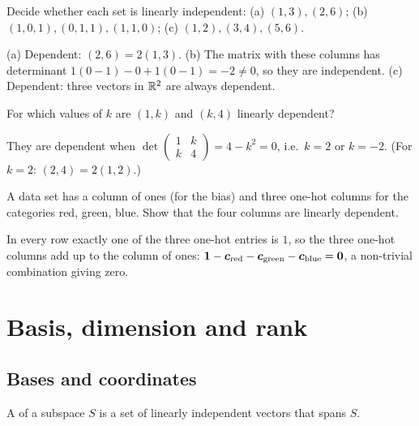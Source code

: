 \sectionexercises

\begin{exercise}
Decide whether each set is linearly independent: (a) $(1, 3), (2, 6)$;
(b) $(1, 0, 1), (0, 1, 1), (1, 1, 0)$; (c) $(1, 2), (3, 4), (5, 6)$.
\end{exercise}
\begin{solution}
(a) Dependent: $(2,6) = 2(1,3)$. (b) The matrix with these columns has
determinant $1(0 - 1) - 0 + 1(0 - 1) = -2 \neq 0$, so they are independent.
(c) Dependent: three vectors in $\mathbb{R}^2$ are always dependent.
\end{solution}

\begin{exercise}
For which values of $k$ are $(1, k)$ and $(k, 4)$ linearly dependent?
\end{exercise}
\begin{solution}
They are dependent when $\det\left(\begin{smallmatrix} 1 & k\\ k &
4\end{smallmatrix}\right) = 4 - k^2 = 0$, i.e.\ $k = 2$ or $k = -2$. (For
$k = 2$: $(2, 4) = 2(1, 2)$.)
\end{solution}

\begin{exercise}
A data set has a column of ones (for the bias) and three one-hot columns for
the categories red, green, blue. Show that the four columns are linearly
dependent.
\end{exercise}
\begin{solution}
In every row exactly one of the three one-hot entries is $1$, so the three
one-hot columns add up to the column of ones:
$\bm{1} - \bm{c}_{\text{red}} - \bm{c}_{\text{green}} - \bm{c}_{\text{blue}} = \bm{0}$, a
non-trivial combination giving zero.
\end{solution}

\section{Basis, dimension and rank}\label{sec:basis}

\subsection{Bases and coordinates}

\begin{definition}[Basis]\label{def:basis}
A  of a subspace $S$ is a set of linearly independent vectors that
spans $S$.
\end{definition}

